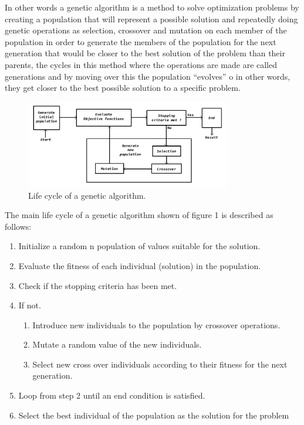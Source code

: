 \documentclass[graybox]{svmult}
\begin{document}
In other words a genetic algorithm is a method to solve optimization problems by creating a population that will represent a possible solution and repeatedly doing genetic operations as selection, crossover and mutation on each member of the population in order to generate the members of the population for the next generation that would be closer to the best solution of the problem than their parents, the cycles in this method where the operations are made are called generations and by moving over this the population “evolves” o in other words, they get closer to the best possible solution  to a specific problem.

\begin{figure}[htbp]
\centerline{\includegraphics[width=90mm]{Images/ga_life_cycle.png}}
\caption{Life cycle of a genetic algorithm.}
\label{fig}
\end{figure}

The main life cycle of a genetic algorithm shown of figure 1 is described as follows:
\begin{enumerate}
    \item Initialize a random n population of values suitable for the solution.
    \item Evaluate the fitness of each individual (solution) in the population.
    \item Check if the stopping criteria has been met.
    \item If not.
    \begin{enumerate}
        \item Introduce new individuals to the population by crossover operations.
        \item Mutate a random value of the new individuals.
        \item Select new cross over individuals according to their fitness for the next generation.
    \end{enumerate}
    \item Loop from step 2 until an end condition is satisfied.
    \item Select the best individual of the population as the solution for the problem
\end{enumerate}
\end{document}
